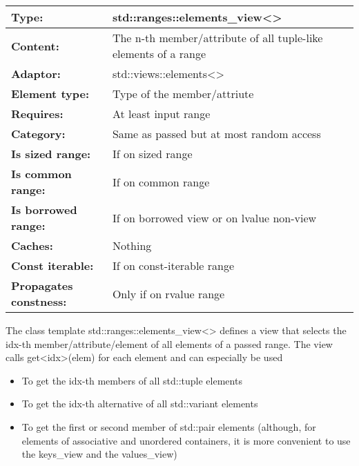 \begin{longtable}[c]{|l|l|}
\hline
\textbf{Type:}              & std::ranges::elements\_view\textless{}\textgreater{}            \\ \hline
\endfirsthead
%
\endhead
%
\textbf{Content:}           & The n-th member/attribute of all tuple-like elements of a range \\ \hline
\textbf{Adaptor:}           & std::views::elements\textless{}\textgreater{}                   \\ \hline
\textbf{Element type:}         & Type of the member/attriute \\ \hline
\textbf{Requires:}             & At least input range        \\ \hline
\textbf{Category:}          & Same as passed but at most random access                        \\ \hline
\textbf{Is sized range:}       & If on sized range           \\ \hline
\textbf{Is common range:}      & If on common range          \\ \hline
\textbf{Is borrowed range:} & If on borrowed view or on lvalue non-view                       \\ \hline
\textbf{Caches:}               & Nothing                     \\ \hline
\textbf{Const iterable:}       & If on const-iterable range  \\ \hline
\textbf{Propagates constness:} & Only if on rvalue range     \\ \hline
\end{longtable}

The class template std::ranges::elements\_view<> defines a view that selects the idx-th member/attribute/element of all elements of a passed range. The view calls get<idx>(elem) for each element and can especially be used

\begin{itemize}
\item
To get the idx-th members of all std::tuple elements

\item
To get the idx-th alternative of all std::variant elements

\item
To get the first or second member of std::pair elements (although, for elements of associative and unordered containers, it is more convenient to use the keys\_view and the values\_view)
\end{itemize}

